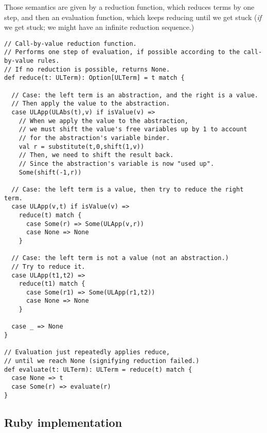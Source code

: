 \documentclass[11pt]{article}
\begin{document}
Those semantics are given by a reduction function,
which reduces terms by one step, and then an evaluation function,
which keeps reducing until we get stuck (\emph{if} we get stuck;
we might have an infinite reduction sequence.)
\begin{verbatim}
// Call-by-value reduction function.
// Performs one step of evaluation, if possible according to the call-by-value rules.
// If no reduction is possible, returns None.
def reduce(t: ULTerm): Option[ULTerm] = t match {

  // Case: the left term is an abstraction, and the right is a value.
  // Then apply the value to the abstraction.
  case ULApp(ULAbs(t),v) if isValue(v) =>
    // When we apply the value to the abstraction,
    // we must shift the value's free variables up by 1 to account
    // for the abstraction's variable binder.
    val r = substitute(t,0,shift(1,v))
    // Then, we need to shift the result back.
    // Since the abstraction's variable is now "used up".
    Some(shift(-1,r))

  // Case: the left term is a value, then try to reduce the right term.
  case ULApp(v,t) if isValue(v) =>
    reduce(t) match {
      case Some(r) => Some(ULApp(v,r))
      case None => None
    }

  // Case: the left term is not a value (not an abstraction.)
  // Try to reduce it.
  case ULApp(t1,t2) =>
    reduce(t1) match {
      case Some(r1) => Some(ULApp(r1,t2))
      case None => None
    }
    
  case _ => None
}

// Evaluation just repeatedly applies reduce,
// until we reach None (signifying reduction failed.)
def evaluate(t: ULTerm): ULTerm = reduce(t) match {
  case None => t
  case Some(r) => evaluate(r)
}
\end{verbatim}

\subsection*{Ruby implementation}
\label{sec:org14f9980}
\end{document}
